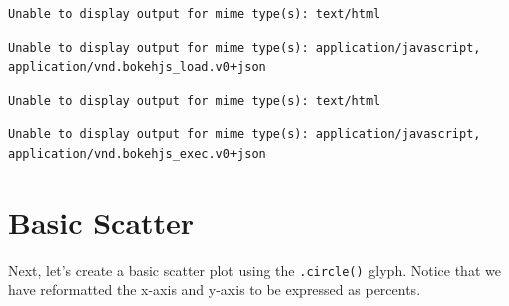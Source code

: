 \documentclass[
  letterpaper,
  DIV=11,
  numbers=noendperiod]{scrreprt}
\begin{document}
\begin{verbatim}
Unable to display output for mime type(s): text/html
\end{verbatim}

\begin{verbatim}
Unable to display output for mime type(s): application/javascript, application/vnd.bokehjs_load.v0+json
\end{verbatim}

\begin{verbatim}
Unable to display output for mime type(s): text/html
\end{verbatim}

\begin{verbatim}
Unable to display output for mime type(s): application/javascript, application/vnd.bokehjs_exec.v0+json
\end{verbatim}

\hypertarget{basic-scatter}{%
\section{Basic Scatter}\label{basic-scatter}}

Next, let's create a basic scatter plot using the \texttt{.circle()}
glyph. Notice that we have reformatted the x-axis and y-axis to be
expressed as percents.
\end{document}
